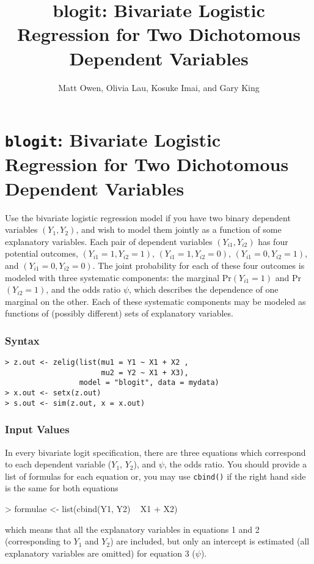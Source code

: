 \documentclass{article}
\title{
  blogit: Bivariate Logistic Regression for Two
  Dichotomous Dependent Variables
}
\author{Matt Owen, Olivia Lau, Kosuke Imai, and Gary King}
\begin{document}
\nobibliography*




\section{{\tt blogit}: Bivariate Logistic Regression for Two
Dichotomous Dependent Variables}\label{blogit}

Use the bivariate logistic regression model if you have two binary
dependent variables $(Y_1, Y_2)$, and wish to model them jointly as a
function of some explanatory variables.  Each pair of dependent
variables $(Y_{i1}, Y_{i2})$ has four potential outcomes, $(Y_{i1}=1,
Y_{i2}=1)$, $(Y_{i1}=1, Y_{i2}=0)$, $(Y_{i1}=0, Y_{i2}=1)$, and
$(Y_{i1}=0, Y_{i2}=0)$.  The joint probability for each of these four
outcomes is modeled with three systematic components: the marginal
Pr$(Y_{i1} = 1)$ and Pr$(Y_{i2} = 1)$, and the odds ratio $\psi$,
which describes the dependence of one marginal on the other.  Each of
these systematic components may be modeled as functions of (possibly
different) sets of explanatory variables.

\subsubsection{Syntax}

\begin{verbatim}
> z.out <- zelig(list(mu1 = Y1 ~ X1 + X2 , 
                      mu2 = Y2 ~ X1 + X3), 
                 model = "blogit", data = mydata)
> x.out <- setx(z.out)
> s.out <- sim(z.out, x = x.out)
\end{verbatim}

\subsubsection{Input Values}

In every bivariate logit specification, there are three equations which
correspond to each dependent variable ($Y_1$, $Y_2$), and $\psi$, the
odds ratio. You should provide a list of formulas for each equation or, 
you may use {\tt cbind()} if the right hand side is the same for both equations
\begin{Schunk}
\begin{Sinput}
> formulae <- list(cbind(Y1, Y2) ~ X1 + X2)
\end{Sinput}
\end{Schunk}
which means that all the explanatory variables in equations 1 and 2
(corresponding to $Y_1$ and $Y_2$) are included, but only an intercept
is estimated (all explanatory variables are omitted) for equation 3
($\psi$).  
\end{document}

